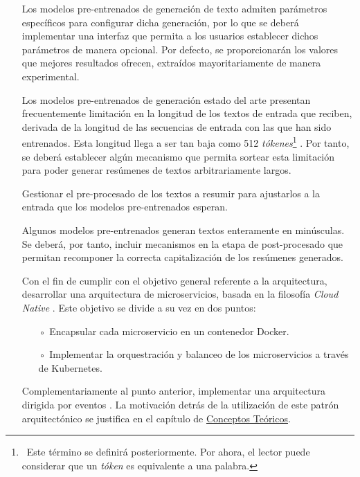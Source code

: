 \begin{itemize}
	\item [\textbullet] Los modelos pre-entrenados de generación de texto admiten parámetros específicos para configurar dicha generación, por lo que se deberá implementar una interfaz que permita a los usuarios establecer dichos parámetros de manera opcional. Por defecto, se proporcionarán los valores que mejores resultados ofrecen, extraídos mayoritariamente de manera experimental.
	
	\item [\textbullet] Los modelos pre-entrenados de generación estado del arte presentan frecuentemente limitación en la longitud de los textos de entrada que reciben, derivada de la longitud de las secuencias de entrada con las que han sido entrenados. Esta longitud llega a ser tan baja como 512 \emph{tókenes}\footnote{\, Este término se definirá posteriormente. Por ahora, el lector puede considerar que un \emph{tóken} es equivalente a una palabra.} \cite{raffel19}. Por tanto, se deberá establecer algún mecanismo que permita sortear esta limitación para poder generar resúmenes de textos arbitrariamente largos.

	\item [\textbullet] Gestionar el pre-procesado de los textos a resumir para ajustarlos a la entrada que los modelos pre-entrenados esperan.

	\item [\textbullet] Algunos modelos pre-entrenados generan textos enteramente en minúsculas. Se deberá, por tanto, incluir mecanismos en la etapa de post-procesado que permitan recomponer la correcta capitalización de los resúmenes generados.

	\item [\textbullet] Con el fin de cumplir con el objetivo general referente a la arquitectura, desarrollar una arquitectura de microservicios, basada en la filosofía \emph{Cloud Native} \cite{cloud20, arundel19}. Este objetivo se divide a su vez en dos puntos:
	\begin{itemize}
		\item [◦] Encapsular cada microservicio en un contenedor Docker.
		\item [◦] Implementar la orquestración y balanceo de los microservicios a través de Kubernetes.
	\end{itemize}

	\item [\textbullet] Complementariamente al punto anterior, implementar una arquitectura dirigida por eventos \cite{bellemare20}. La motivación detrás de la utilización de este patrón arquitectónico se justifica en el capítulo de \hyperref[chapter:conceptos]{Conceptos Teóricos}.
	

\end{itemize}
